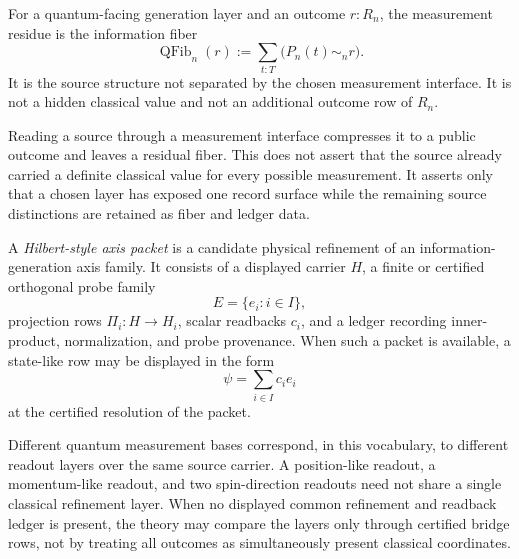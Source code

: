 \begin{definition}
\label{def:quantum-measurement-residue}
For a quantum-facing generation layer and an outcome $r:R_n$, the
measurement residue is the information fiber
$$
\operatorname{QFib}_n(r)
:=
\sum_{t:T}\bigl(P_n(t)\sim_n r\bigr).
$$
It is the source structure not separated by the chosen measurement
interface. It is not a hidden classical value and not an additional
outcome row of $R_n$.
\end{definition}

\begin{principle}
\label{prin:quantum-projection-not-hidden-variable}
Reading a source through a measurement interface compresses it to a
public outcome and leaves a residual fiber. This does not assert that the
source already carried a definite classical value for every possible
measurement. It asserts only that a chosen layer has exposed one record
surface while the remaining source distinctions are retained as fiber
and ledger data.
\end{principle}

\begin{definition}
\label{def:quantum-hilbert-style-axis-packet}
A \emph{Hilbert-style axis packet} is a candidate physical refinement of
an information-generation axis family. It consists of a displayed carrier
$H$, a finite or certified orthogonal probe family
$$
E=\{e_i:i\in I\},
$$
projection rows $\Pi_i:H\to H_i$, scalar readbacks $c_i$, and a ledger
recording inner-product, normalization, and probe provenance. When such
a packet is available, a state-like row may be displayed in the form
$$
\psi=\sum_{i\in I}c_i e_i
$$
at the certified resolution of the packet.
\end{definition}

\begin{principle}
\label{prin:quantum-measurement-bases-readout-layers}
Different quantum measurement bases correspond, in this vocabulary, to
different readout layers over the same source carrier. A position-like
readout, a momentum-like readout, and two spin-direction readouts need
not share a single classical refinement layer. When no displayed common
refinement and readback ledger is present, the theory may compare the
layers only through certified bridge rows, not by treating all outcomes
as simultaneously present classical coordinates.
\end{principle}

